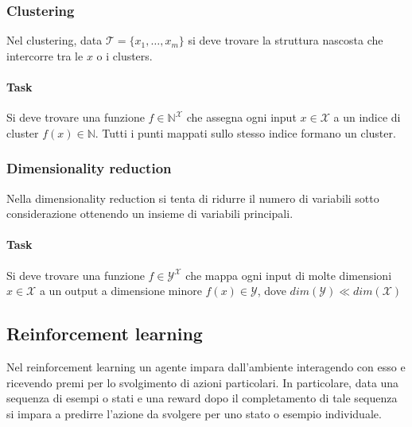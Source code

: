 		\subsubsection{Clustering}
		Nel clustering, data $\mathcal{T}=\{x_1, \dots, x_m\}$ si deve trovare la struttura nascosta che intercorre tra le $x$ o i clusters.

			\paragraph{Task}
			Si deve trovare una funzione $f\in\mathbb{N}^{\mathcal{X}}$ che assegna ogni input $x\in\mathcal{X}$ a un indice di cluster $f(x)\in\mathbb{N}$.
			Tutti i punti mappati sullo stesso indice formano un cluster.

		\subsubsection{Dimensionality reduction}
		Nella dimensionality reduction si tenta di ridurre il numero di variabili sotto considerazione ottenendo un insieme di variabili principali.

			\paragraph{Task}
			Si deve trovare una funzione $f\in\mathcal{Y}^\mathcal{X}$ che mappa ogni input di molte dimensioni $x\in\mathcal{X}$ a un output a dimensione minore $f(x)\in\mathcal{Y}$, dove $dim(\mathcal{Y})\ll dim(\mathcal{X})$

	\subsection{Reinforcement learning}
	Nel reinforcement learning un agente impara dall'ambiente interagendo con esso e ricevendo premi per lo svolgimento di azioni particolari.
	In particolare, data una sequenza di esempi o stati e una reward dopo il completamento di tale sequenza si impara a predirre l'azione da svolgere per uno stato o esempio individuale.
